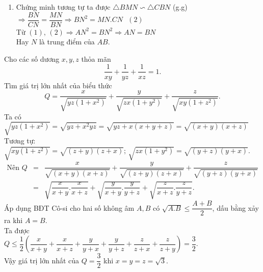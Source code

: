 \begin{ex}
{\begin{enumerate}
{        $\Rightarrow \triangle NAM \backsim \triangle NCA$ (g.g)\\
        $\Rightarrow \dfrac{NA}{NC}=\dfrac{MN}{AN} \Rightarrow AN^2=MN.CN\,\,\,\,(1)$}
        \item {Chứng minh tương tự ta được $\triangle BMN \backsim \triangle CBN$ (g.g)\\
        $\Rightarrow \dfrac{BN}{CN}=\dfrac{MN}{BN} \Rightarrow BN^2=MN.CN\,\,\,\,(2)$\\
        Từ $(1),\,(2) \Rightarrow AN^2=BN^2 \Rightarrow AN=BN$\\
        Hay $N$ là trung điểm của $AB$.}
    \end{enumerate}
   }
\end{ex}

\begin{ex}%
    Cho các số dương $x, y, z$ thỏa mãn
    $$\dfrac{1}{xy}+\dfrac{1}{yz}+\dfrac{1}{xz}=1.$$
    Tìm giá trị lớn nhất của biểu thức
    $$Q=\dfrac{x}{\sqrt{yz(1+x^2)}}+\dfrac{y}{\sqrt{zx(1+y^2)}}+\dfrac{z}{\sqrt{xy(1+z^2)}}.$$
\loigiai
    {Ta có $\sqrt{yz(1+x^2)}=\sqrt{yz+x^2yz}=\sqrt{yz+x(x+y+z)}=\sqrt{(x+y)(x+z)}$\\
    Tương tự: $\sqrt{xy(1+z^2)}=\sqrt{(z+y)(z+x)};\, \sqrt{zx(1+y^2)}=\sqrt{(y+z)(y+x)}$.
    \begin{eqnarray*}
    \text{Nên}\,\, Q &=& \dfrac{x}{\sqrt{(x+y)(x+z)}}+\dfrac{y}{\sqrt{(z+y)(z+x)}}+\dfrac{z}{\sqrt{(y+z)(y+x)}}\\
    &=& \sqrt{\dfrac{x}{x+y}.\dfrac{x}{x+z}}+\sqrt{\dfrac{y}{x+y}.\dfrac{y}{y+z}}+\sqrt{\dfrac{z}{x+z}.\dfrac{z}{y+z}}.
    \end{eqnarray*}    
    Áp dụng BĐT Cô-si cho hai số không âm $A, B$ có $\sqrt{A.B} \le \dfrac{A+B}{2}$, dấu bằng xảy ra khi $A=B$.\\
    Ta được\\
    $Q \le \dfrac{1}{2} \left(\dfrac{x}{x+y}+\dfrac{x}{x+z}+\dfrac{y}{y+x}+\dfrac{y}{y+z}+\dfrac{z}{z+x}+\dfrac{z}{z+y}\right)=\dfrac{3}{2}$.\\
    Vậy giá trị lớn nhất của $Q=\dfrac{3}{2}$ khi $x=y=z=\sqrt{3}.$
   }
\end{ex}

